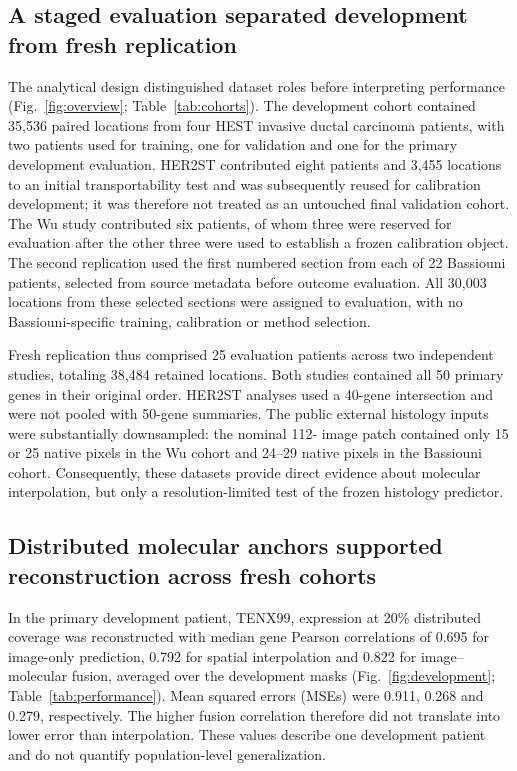 \subsection{A staged evaluation separated development from fresh replication}
The analytical design distinguished dataset roles before interpreting performance (Fig.~\ref{fig:overview}; Table~\ref{tab:cohorts}). The development cohort contained 35,536 paired locations from four HEST invasive ductal carcinoma patients, with two patients used for training, one for validation and one for the primary development evaluation. HER2ST contributed eight patients and 3,455 locations to an initial transportability test and was subsequently reused for calibration development; it was therefore not treated as an untouched final validation cohort. The Wu study contributed six patients, of whom three were reserved for evaluation after the other three were used to establish a frozen calibration object. The second replication used the first numbered section from each of 22 Bassiouni patients, selected from source metadata before outcome evaluation. All 30,003 locations from these selected sections were assigned to evaluation, with no Bassiouni-specific training, calibration or method selection.

Fresh replication thus comprised 25 evaluation patients across two independent studies, totaling 38,484 retained locations. Both studies contained all 50 primary genes in their original order. HER2ST analyses used a 40-gene intersection and were not pooled with 50-gene summaries. The public external histology inputs were substantially downsampled: the nominal 112-\um{} image patch contained only 15 or 25 native pixels in the Wu cohort and 24--29 native pixels in the Bassiouni cohort. Consequently, these datasets provide direct evidence about molecular interpolation, but only a resolution-limited test of the frozen histology predictor.




\FloatBarrier

\subsection{Distributed molecular anchors supported reconstruction across fresh cohorts}
In the primary development patient, TENX99, expression at 20\% distributed coverage was reconstructed with median gene Pearson correlations of 0.695 for image-only prediction, 0.792 for spatial interpolation and 0.822 for image--molecular fusion, averaged over the development masks (Fig.~\ref{fig:development}; Table~\ref{tab:performance}). Mean squared errors (MSEs) were 0.911, 0.268 and 0.279, respectively. The higher fusion correlation therefore did not translate into lower error than interpolation. These values describe one development patient and do not quantify population-level generalization.

